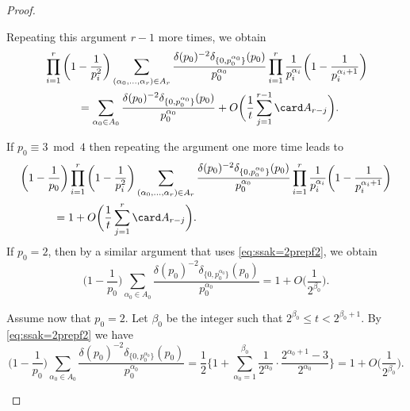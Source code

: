 \documentclass[12pt, reqno, twoside, letterpaper]{amsart}
\begin{document}
\begin{jetsam}
\begin{proof}
\begin{nixnix}
%
Repeating this argument $r - 1$ more times, we obtain
\begin{align*}
 & 
  \prod_{i = 1}^r\bigg(1 - \frac{1}{p_i^2}\bigg)
   \sum_{(\alpha_0,\ldots,\alpha_r) \in A_r}
    \frac{\delta(p_0)^{-2}\delta_{\{0,p_0^{\alpha_0}\}}(p_0)}{p_0^{\alpha_0}}
     \prod_{i = 1}^r 
      \frac{1}{p_i^{\alpha_i}}
       \bigg(1 - \frac{1}{p_i^{\alpha_i + 1}}\bigg) 
  \\
 & \hspace{30pt} =
   \sum_{\alpha_0 \in A_0}
    \frac{\delta(p_0)^{-2}\delta_{\{0,p_0^{\alpha_0}\}}(p_0)}{p_0^{\alpha_0}}
     +
      O\bigg(\frac{1}{t}\sum_{j = 1}^{r - 1} \card A_{r - j}\bigg).
\end{align*}
\end{nixnix}
%
If $p_0 \equiv 3 \bmod 4$ then repeating the argument one more 
time leads to 
\begin{align}
 \begin{split}
  \label{eq:ssak=2prepf5}
 & 
  \bigg(1 - \frac{1}{p_0}\bigg)
   \prod_{i = 1}^r\bigg(1 - \frac{1}{p_i^2}\bigg)
    \sum_{(\alpha_0,\ldots,\alpha_r) \in A_r}
     \frac{\delta(p_0)^{-2}\delta_{\{0,p_0^{\alpha_0}\}}(p_0)}{p_0^{\alpha_0}}
      \prod_{i = 1}^r 
       \frac{1}{p_i^{\alpha_i}}
        \bigg(1 - \frac{1}{p_i^{\alpha_i + 1}}\bigg) 
  \\
 & \hspace{30pt} =
   1
     +
      O\bigg(\frac{1}{t}\sum_{j = 1}^{r} \card A_{r - j}\bigg).
 \end{split}
\end{align}
%
If $p_0 = 2$, then by a similar argument that uses 
\eqref{eq:ssak=2prepf2}, we obtain 
\begin{equation*}
   \bigg(1 - \frac{1}{p_0}\bigg)
    \sum_{\alpha_0 \in A_0}
     \frac{\delta(p_0)^{-2}\delta_{\{0,p_0^{\alpha_0}\}}(p_0)}{p_0^{\alpha_0}}
   = 
    1 + O\bigg(\frac{1}{2^{\beta_0}}\bigg).
\end{equation*}
%
\begin{nixnix}
Assume now that $p_0 = 2$.
%
Let $\beta_0$ be the integer such that 
$2^{\beta_0} \le t < 2^{\beta_0 + 1}$.
%
By \eqref{eq:ssak=2prepf2} we have 
\begin{equation*}
   \bigg(1 - \frac{1}{p_0}\bigg)
    \sum_{\alpha_0 \in A_0}
     \frac{\delta(p_0)^{-2}\delta_{\{0,p_0^{\alpha_0}\}}(p_0)}{p_0^{\alpha_0}}
   = 
   \frac{1}{2}
    \bigg\{ 
     1
      +
     \sum_{\alpha_0 = 1}^{\beta_0}
      \frac{1}{2^{\alpha_0}}
       \cdot 
        \frac{2^{\alpha_0 + 1} - 3}{2^{\alpha_0}}
    \bigg\}
   = 
    1 + O\bigg(\frac{1}{2^{\beta_0}}\bigg).
\end{equation*}
\end{nixnix}


\end{proof}
\end{jetsam}
\end{document}
